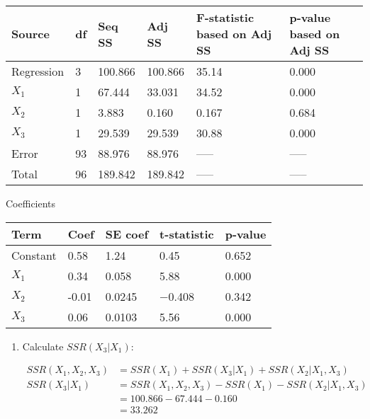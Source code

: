 \documentclass{article}
\providecommand{\tightlist}{%
      \setlength{\itemsep}{0pt}\setlength{\parskip}{0pt}}
\begin{document}
\begin{longtable}[c]{@{}llllll@{}}
\toprule
Source & df & Seq SS & Adj SS & F-statistic based on Adj SS & p-value
based on Adj SS\tabularnewline
\midrule
\endhead
Regression & 3 & 100.866 & 100.866 & 35.14 & 0.000\tabularnewline
\(X_1\) & 1 & 67.444 & 33.031 & 34.52 & 0.000\tabularnewline
\(X_2\) & 1 & 3.883 & 0.160 & 0.167 & 0.684\tabularnewline
\(X_3\) & 1 & 29.539 & 29.539 & 30.88 & 0.000\tabularnewline
Error & 93 & 88.976 & 88.976 & ----- & -----\tabularnewline
Total & 96 & 189.842 & 189.842 & ----- & -----\tabularnewline
\bottomrule
\end{longtable}

Coefficients

\begin{longtable}[c]{@{}lllll@{}}
\toprule
Term & Coef & SE coef & t-statistic & p-value\tabularnewline
\midrule
\endhead
Constant & 0.58 & 1.24 & 0.45 & 0.652\tabularnewline
\(X_1\) & 0.34 & 0.058 & 5.88 & 0.000\tabularnewline
\(X_2\) & -0.01 & 0.0245 & −0.408 & 0.342\tabularnewline
\(X_3\) & 0.06 & 0.0103 & 5.56 & 0.000\tabularnewline
\bottomrule
\end{longtable}

\newpage
\begin{enumerate}
\def\labelenumi{\alph{enumi})}
\setcounter{enumi}{1}
\tightlist
\item
  Calculate \(SSR(X_3 | X_1)\):

\begin{align*}
SSR(X_1, X_2, X_3) &= SSR(X_1) + SSR(X_3 | X_1) + SSR(X_2 | X_1, X_3) \\
SSR(X_3 | X_1) &= SSR(X_1, X_2, X_3) - SSR(X_1) - SSR(X_2 | X_1, X_3) \\
	       &= 100.866 - 67.444 - 0.160  \\
	       &= 33.262
\end{align*}
\end{enumerate}
\end{document}

